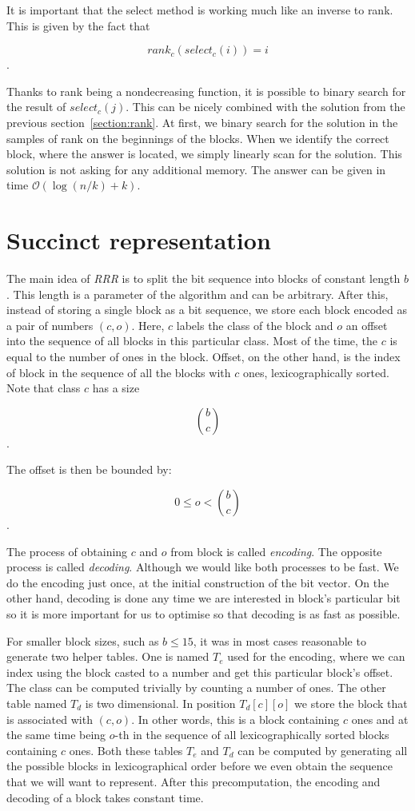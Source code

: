 It is important that the select method is working much like an inverse to rank. This is given
by the fact that

                $$rank_c(select_c(i)) = i$$.

Thanks to rank being a nondecreasing function, it is possible to binary search for the result
of $select_c(j)$. This can be nicely combined with the solution from the previous
section~\ref{section:rank}. At first, we binary search for the solution in the samples of rank
on the beginnings of the blocks. When we identify the correct block, where the answer is
located, we simply linearly scan for the solution. This solution is not asking for any
additional memory. The answer can be given in time $\mathcal{O}(\log(n/k)+k)$.

\section{Succinct representation}

The main idea of \textit{RRR} is to split the bit sequence into blocks of constant length $b$.
This length is a parameter of the algorithm and can be arbitrary. After this, instead
of storing a single block as a bit sequence, we store each block encoded as a pair
of numbers $(c, o)$. Here, $c$ labels the class of the block and $o$ an offset into
the sequence of all blocks in this particular class. Most of the time, the $c$ is equal
to the number of ones in the block. Offset, on the other hand, is the index of block in
the sequence of all the blocks with $c$ ones, lexicographically sorted. Note that
class $c$ has a size

                $${b\choose c}$$.

The offset is then be bounded by:

				$$0 \leq o < {b\choose c}$$.

The process of obtaining $c$ and $o$ from block is called \textit{encoding}.
The opposite process is called \textit{decoding}. Although we would like both
processes to be fast. We do the encoding just once, at the initial construction
of the bit vector. On the other hand, decoding is done any time we are interested in
block's particular bit so it is more important for us to optimise so that decoding
is as fast as possible.

For smaller block sizes, such as $b\leq 15$, it was in most cases reasonable to
generate two helper tables. One is named $T_e$ used for the encoding, where we can
index using the block casted to a number and get this particular block's offset.
The class can be computed trivially by counting a number of ones. The other table
named $T_d$ is two dimensional. In position $T_d[c][o]$ we store the block that
is associated with $(c, o)$. In other words, this is a block containing $c$ ones
and at the same time being $o$-th in the sequence of all lexicographically sorted
blocks containing $c$ ones. Both these tables $T_e$ and $T_d$ can be computed
by generating all the possible blocks in lexicographical order before we even
obtain the sequence that we will want to represent. After this precomputation,
the encoding and decoding of a block takes constant time.

